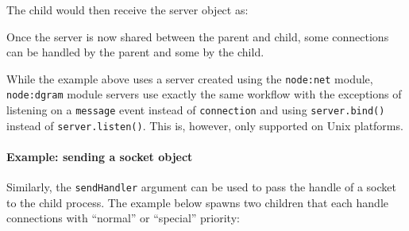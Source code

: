 The child would then receive the server object as:

\begin{Shaded}
\begin{Highlighting}[]
\NormalTok{(}\OperatorTok{,}\OperatorTok{,}\KeywordTok{=\textgreater{}}\NormalTok{ \{}
  \OperatorTok{===} \NormalTok{) \{}
\NormalTok{(}\OperatorTok{,}\KeywordTok{=\textgreater{}}\NormalTok{ \{}
\NormalTok{(}\NormalTok{)}\OperatorTok{;}
\NormalTok{    \})}\OperatorTok{;}
\NormalTok{  \}}
\NormalTok{\})}\OperatorTok{;}
\end{Highlighting}
\end{Shaded}

Once the server is now shared between the parent and child, some
connections can be handled by the parent and some by the child.

While the example above uses a server created using the
\texttt{node:net} module, \texttt{node:dgram} module servers use exactly
the same workflow with the exceptions of listening on a
\texttt{\textquotesingle{}message\textquotesingle{}} event instead of
\texttt{\textquotesingle{}connection\textquotesingle{}} and using
\texttt{server.bind()} instead of \texttt{server.listen()}. This is,
however, only supported on Unix platforms.

\paragraph{Example: sending a socket
object}\label{example-sending-a-socket-object}

Similarly, the \texttt{sendHandler} argument can be used to pass the
handle of a socket to the child process. The example below spawns two
children that each handle connections with ``normal'' or ``special''
priority:

